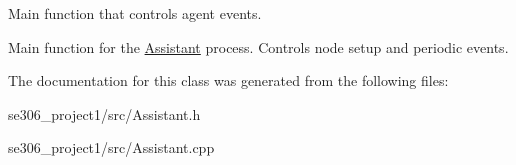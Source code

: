 Main function that controls agent events. 

Main function for the \hyperlink{classAssistant}{Assistant} process. Controls node setup and periodic events. 

The documentation for this class was generated from the following files\-:\begin{DoxyCompactItemize}
\item 
se306\-\_\-project1/src/Assistant.\-h\item 
se306\-\_\-project1/src/Assistant.\-cpp\end{DoxyCompactItemize}
